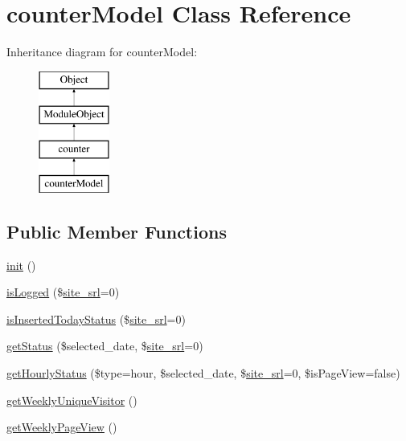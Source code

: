 \hypertarget{classcounterModel}{}\section{counter\+Model Class Reference}
\label{classcounterModel}
Inheritance diagram for counter\+Model\+:\begin{figure}[H]
\begin{center}
\leavevmode
\includegraphics[height=4.000000cm]{classcounterModel}
\end{center}
\end{figure}
\subsection*{Public Member Functions}
\begin{DoxyCompactItemize}
\item 
\hyperlink{classcounterModel_a3131ee0122d97e0b7d39d6d31a7227dc}{init} ()
\item 
\hyperlink{classcounterModel_a8d9351da08e33d6f47f8645d87ec9380}{is\+Logged} (\$\hyperlink{ko_8install_8php_a8b1406b4ad1048041558dce6bfe89004}{site\+\_\+srl}=0)
\item 
\hyperlink{classcounterModel_ad2e64d22eb37f58e91a37ebb1f421d35}{is\+Inserted\+Today\+Status} (\$\hyperlink{ko_8install_8php_a8b1406b4ad1048041558dce6bfe89004}{site\+\_\+srl}=0)
\item 
\hyperlink{classcounterModel_a83bc31a1c941d3972dba6eae69eab1f6}{get\+Status} (\$selected\+\_\+date, \$\hyperlink{ko_8install_8php_a8b1406b4ad1048041558dce6bfe89004}{site\+\_\+srl}=0)
\item 
\hyperlink{classcounterModel_a2926667c5fd5b07947e40d705f62e292}{get\+Hourly\+Status} (\$type=\textquotesingle{}hour\textquotesingle{}, \$selected\+\_\+date, \$\hyperlink{ko_8install_8php_a8b1406b4ad1048041558dce6bfe89004}{site\+\_\+srl}=0, \$is\+Page\+View=false)
\item 
\hyperlink{classcounterModel_ad43ae0f93cd42e9a59262abfe296fb9a}{get\+Weekly\+Unique\+Visitor} ()
\item 
\hyperlink{classcounterModel_a026465ce135cfff7827d869f1adaeb83}{get\+Weekly\+Page\+View} ()
\end{DoxyCompactItemize}
